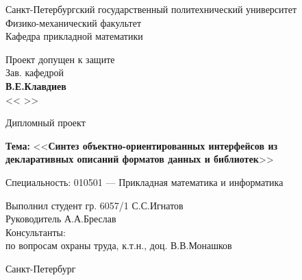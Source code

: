 \begin{titlepage}
\newpage

\begin{center}
Санкт-Петербургский государственный политехнический университет \\
Физико-механический факультет \\
Кафедра прикладной математики \\
\end{center}


\begin{flushright}
Проект допущен к защите \\
Зав. кафедрой \makebox[2.1cm]{\hfill} \\
\makebox[1.8cm]{\hrulefill} \textbf{В.Е.Клавдиев} \\
<< \makebox[1.1cm]{\hrulefill} >> \makebox[3cm]{\hrulefill} \\

\end{flushright}

\vspace{4em}

\begin{center}
\Large Дипломный проект
\end{center}
\begin{center}
\textbf{Тема:} <<\textbf{Синтез объектно-ориентированных интерфейсов из \\
 декларативных описаний форматов данных и библиотек}>>
\end{center}

\vspace{2em}

\begin{flushleft}
Специальность: 010501 --- Прикладная математика и информатика
\end{flushleft}

\vspace{3em}

\begin{flushleft}
Выполнил студент гр. 6057/1 \hfill С.С.Игнатов \\
\vspace{1.5em}
Руководитель \hfill А.А.Бреслав \\
\vspace{3.5em}
Консультанты: \\
\hspace{1em} по вопросам охраны труда, к.т.н., доц. \hfill В.В.Монашков
\end{flushleft}

\vspace{\fill}

\begin{center}
Санкт-Петербург \\
\number\year

\end{center}

\end{titlepage}